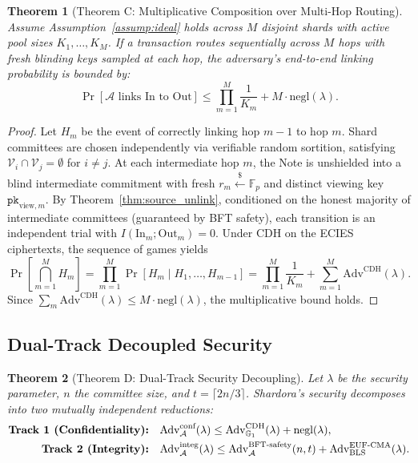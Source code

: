 \documentclass[sigconf,nonacm]{acmart}
\newtheorem{theorem}{Theorem}
\begin{document}
\begin{theorem}[Theorem C: Multiplicative Composition over Multi-Hop Routing]\label{thm:multiplicative}
Assume Assumption~\ref{assump:ideal} holds across $M$ disjoint shards with active pool sizes $K_1, \dots, K_M$. If a transaction routes sequentially across $M$ hops with fresh blinding keys sampled at each hop, the adversary's end-to-end linking probability is bounded by:
\begin{equation}
\Pr[\mathcal{A} \text{ links In to Out}] \le \prod_{m=1}^M \frac{1}{K_m} + M \cdot \text{negl}(\lambda).
\end{equation}
\end{theorem}

\begin{proof}
Let $H_m$ be the event of correctly linking hop $m-1$ to hop $m$. Shard committees are chosen independently via verifiable random sortition, satisfying $\mathcal{V}_i \cap \mathcal{V}_j = \emptyset$ for $i \neq j$. At each intermediate hop $m$, the Note is unshielded into a blind intermediate commitment with fresh $r_m \xleftarrow{\$} \mathbb{F}_p$ and distinct viewing key $\mathtt{pk}_{\text{view}, m}$. By Theorem~\ref{thm:source_unlink}, conditioned on the honest majority of intermediate committees (guaranteed by BFT safety), each transition is an independent trial with $I(\text{In}_m; \text{Out}_m) = 0$. Under CDH on the ECIES ciphertexts, the sequence of games yields
\begin{equation}
\Pr\left[\bigcap_{m=1}^M H_m\right] = \prod_{m=1}^M \Pr[H_m \mid H_1, \dots, H_{m-1}] = \prod_{m=1}^M \frac{1}{K_m} + \sum_{m=1}^M \text{Adv}^{\text{CDH}}(\lambda).
\end{equation}
Since $\sum_{m} \text{Adv}^{\text{CDH}}(\lambda) \le M \cdot \text{negl}(\lambda)$, the multiplicative bound holds.
\end{proof}

\subsection{Dual-Track Decoupled Security}

\begin{theorem}[Theorem D: Dual-Track Security Decoupling]\label{thm:dual_track}
Let $\lambda$ be the security parameter, $n$ the committee size, and $t = \lceil 2n/3 \rceil$. Shardora's security decomposes into two mutually independent reductions:
\begin{align}
\text{\textbf{Track 1 (Confidentiality):}} \quad & \text{Adv}^{\text{conf}}_{\mathcal{A}}(\lambda) \le \text{Adv}^{\text{CDH}}_{\mathbb{G}_1}(\lambda) + \text{negl}(\lambda), \\
\text{\textbf{Track 2 (Integrity):}} \quad & \text{Adv}^{\text{integ}}_{\mathcal{A}}(\lambda) \le \text{Adv}^{\text{BFT-safety}}_{\mathcal{A}}(n, t) + \text{Adv}^{\text{EUF-CMA}}_{\text{BLS}}(\lambda).
\end{align}
\end{theorem}
\end{document}
